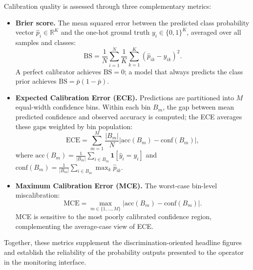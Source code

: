 Calibration quality is assessed through three complementary metrics:

\begin{itemize}
    \item \textbf{Brier score.} The mean squared error between the predicted class probability vector $\hat{p}_i \in \mathbb{R}^K$ and the one-hot ground truth $y_i \in \{0,1\}^K$, averaged over all samples and classes:
    \[
        \mathrm{BS} = \frac{1}{N} \sum_{i=1}^{N} \frac{1}{K} \sum_{k=1}^{K} (\hat{p}_{ik} - y_{ik})^2.
    \]
    A perfect calibrator achieves $\mathrm{BS} = 0$; a model that always predicts the class prior achieves $\mathrm{BS} = \bar{p}(1-\bar{p})$.

    \item \textbf{Expected Calibration Error (ECE).} Predictions are partitioned into $M$ equal-width confidence bins. Within each bin $B_m$, the gap between mean predicted confidence and observed accuracy is computed; the ECE averages these gaps weighted by bin population:
    \[
        \mathrm{ECE} = \sum_{m=1}^{M} \frac{|B_m|}{N} \left| \mathrm{acc}(B_m) - \mathrm{conf}(B_m) \right|,
    \]
    where $\mathrm{acc}(B_m) = \frac{1}{|B_m|}\sum_{i \in B_m}\mathbf{1}[\hat{y}_i = y_i]$ and $\mathrm{conf}(B_m) = \frac{1}{|B_m|}\sum_{i \in B_m}\max_k \hat{p}_{ik}$.

    \item \textbf{Maximum Calibration Error (MCE).} The worst-case bin-level miscalibration:
    \[
        \mathrm{MCE} = \max_{m \in \{1,\ldots,M\}} \left| \mathrm{acc}(B_m) - \mathrm{conf}(B_m) \right|.
    \]
    MCE is sensitive to the most poorly calibrated confidence region, complementing the average-case view of ECE.
\end{itemize}

Together, these metrics supplement the discrimination-oriented headline figures and establish the reliability of the probability outputs presented to the operator in the monitoring interface.





